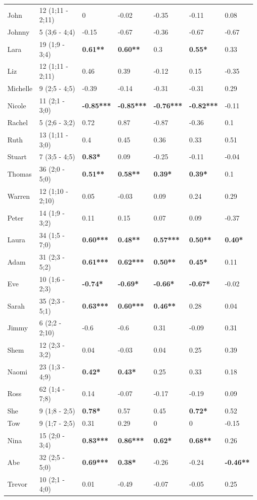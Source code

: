 \begin{table}[]
\begin{tabular}{ll|lllll}
John&12 (1;11 - 2;11)&0&-0.02&-0.35&-0.11&0.08\\
Johnny&5 (3;6 - 4;4)&-0.15&-0.67&-0.36&-0.67&-0.67\\
Lara&19 (1;9 - 3;4)&\textbf{0.61**}&\textbf{0.60**}&0.3&\textbf{0.55*}&0.33\\
Liz&12 (1;11 - 2;11)&0.46&0.39&-0.12&0.15&-0.35\\
Michelle&9 (2;5 - 4;5)&-0.39&-0.14&-0.31&-0.31&0.29\\
Nicole&11 (2;1 - 3;0)&\textbf{-0.85***}&\textbf{-0.85***}&\textbf{-0.76***}&\textbf{-0.82***}&-0.11\\
Rachel&5 (2;6 - 3;2)&0.72&0.87&-0.87&-0.36&0.1\\
Ruth&13 (1;11 - 3;0)&0.4&0.45&0.36&0.33&0.51\\
Stuart&7 (3;5 - 4;5)&\textbf{0.83*}&0.09&-0.25&-0.11&-0.04\\
Thomas&36 (2;0 - 5;0)&\textbf{0.51**}&\textbf{0.58**}&\textbf{0.39*}&\textbf{0.39*}&0.1\\
Warren&12 (1;10 - 2;10)&0.05&-0.03&0.09&0.24&0.29\\
Peter&14 (1;9 - 3;2)&0.11&0.15&0.07&0.09&-0.37\\
Laura&34 (1;5 - 7;0)&\textbf{0.60***}&\textbf{0.48**}&\textbf{0.57***}&\textbf{0.50**}&\textbf{0.40*}\\
Adam&31 (2;3 - 5;2)&\textbf{0.61***}&\textbf{0.62***}&\textbf{0.50**}&\textbf{0.45*}&0.11\\
Eve&10 (1;6 - 2;3)&\textbf{-0.74*}&\textbf{-0.69*}&\textbf{-0.66*}&\textbf{-0.67*}&-0.02\\
Sarah&35 (2;3 - 5;1)&\textbf{0.63***}&\textbf{0.60***}&\textbf{0.46**}&0.28&0.04\\
Jimmy&6 (2;2 - 2;10)&-0.6&-0.6&0.31&-0.09&0.31\\
Shem&12 (2;3 - 3;2)&0.04&-0.03&0.04&0.25&0.39\\
Naomi&23 (1;3 - 4;9)&\textbf{0.42*}&\textbf{0.43*}&0.25&0.33&0.18\\
Ross&62 (1;4 - 7;8)&0.14&-0.07&-0.17&-0.19&0.09\\
She&9 (1;8 - 2;5)&\textbf{0.78*}&0.57&0.45&\textbf{0.72*}&0.52\\
Tow&9 (1;7 - 2;5)&0.31&0.29&0&0&-0.15\\
Nina&15 (2;0 - 3;4)&\textbf{0.83***}&\textbf{0.86***}&\textbf{0.62*}&\textbf{0.68**}&0.26\\
Abe&32 (2;5 - 5;0)&\textbf{0.69***}&\textbf{0.38*}&-0.26&-0.24&\textbf{-0.46**}\\
Trevor&10 (2;1 - 4;0)&0.01&-0.49&-0.07&-0.05&0.25\\

\end{tabular}
\end{table}
